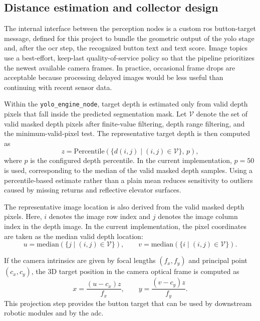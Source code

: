 \subsection{Distance estimation and collector design}

The internal interface between the perception nodes is a custom \gls{ros}
button-target message, defined for this project to bundle the geometric output
of the \gls{yolo} stage and, after the \gls{ocr} step, the recognized button
text and text score. Image topics use a
best-effort, keep-last quality-of-service policy so that the pipeline
prioritizes the newest available camera frames. In practice, occasional frame
drops are acceptable because processing delayed images would be less useful than
continuing with recent sensor data.

Within the \texttt{yolo\_engine\_node}, target depth is estimated only from valid
depth pixels that fall inside the predicted segmentation mask. Let $\mathcal{V}$
denote the set of valid masked depth pixels after finite-value filtering, depth
range filtering, and the minimum-valid-pixel test. The representative target depth
is then computed as
\begin{equation}
z = \mathrm{Percentile}\left(\{d(i,j)\mid (i,j)\in \mathcal{V}\},\, p\right),
\end{equation}
where $p$ is the configured depth percentile. In the current implementation,
$p=50$ is used, corresponding to the median of the valid masked depth samples.
Using a percentile-based estimate rather than a plain mean reduces sensitivity to
outliers caused by missing returns and reflective elevator surfaces.

The representative image location is also derived from the valid masked depth
pixels. Here, $i$ denotes the image row index and $j$ denotes the image column
index in the depth image. In the current implementation, the pixel coordinates
are taken as the median valid depth location:
\begin{equation}
u = \mathrm{median}\left(\{j \mid (i,j)\in \mathcal{V}\}\right), \qquad
v = \mathrm{median}\left(\{i \mid (i,j)\in \mathcal{V}\}\right).
\end{equation}

If the camera intrinsics are given by focal lengths $(f_x,f_y)$ and principal
point $(c_x,c_y)$, the 3D target position in the camera optical frame is computed
as
\begin{equation}
x = \frac{(u-c_x)z}{f_x}, \qquad
y = \frac{(v-c_y)z}{f_y}.
\end{equation}
This projection step provides the button target that can be used by downstream robotic
modules and by the \gls{adc}.

